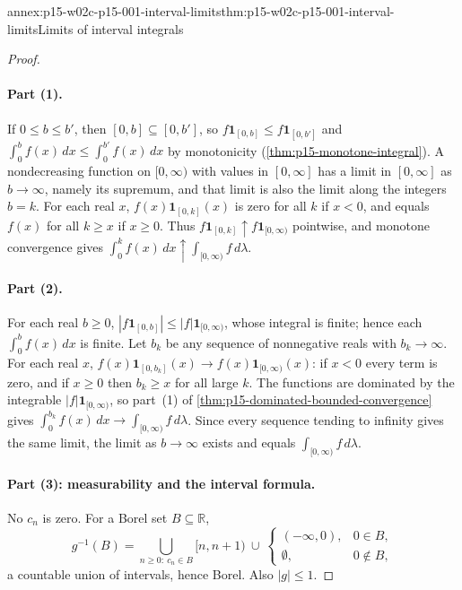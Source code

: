 \begin{annexitem}{annex:p15-w02c-p15-001-interval-limits}{thm:p15-w02c-p15-001-interval-limits}{Limits of interval integrals}
\begin{proof}
\paragraph{Part (1).}
If \(0\leq b\leq b'\), then \([0,b]\subseteq[0,b']\), so
\(f\mathbf1_{[0,b]}\leq f\mathbf1_{[0,b']}\) and
\(\int_0^bf(x)\,dx\leq\int_0^{b'}f(x)\,dx\) by monotonicity
(\cref{thm:p15-monotone-integral}). A nondecreasing function on
\([0,\infty)\) with values in \([0,\infty]\) has a limit in
\([0,\infty]\) as \(b\to\infty\), namely its supremum, and that limit is
also the limit along the integers \(b=k\). For each real \(x\),
\(f(x)\mathbf1_{[0,k]}(x)\) is zero for all \(k\) if \(x<0\), and equals
\(f(x)\) for all \(k\geq x\) if \(x\geq0\). Thus
\(f\mathbf1_{[0,k]}\uparrow f\mathbf1_{[0,\infty)}\) pointwise, and
monotone convergence gives
\(\int_0^kf(x)\,dx\uparrow\int_{[0,\infty)}f\,d\lambda\).

\paragraph{Part (2).}
For each real \(b\geq0\),
\(|f\mathbf1_{[0,b]}|\leq|f|\mathbf1_{[0,\infty)}\), whose integral is
finite; hence each \(\int_0^bf(x)\,dx\) is finite. Let \(b_k\) be any
sequence of nonnegative reals with \(b_k\to\infty\). For each real
\(x\), \(f(x)\mathbf1_{[0,b_k]}(x)\to f(x)\mathbf1_{[0,\infty)}(x)\): if
\(x<0\) every term is zero, and if \(x\geq0\) then \(b_k\geq x\) for all
large \(k\). The functions are dominated by the integrable
\(|f|\mathbf1_{[0,\infty)}\), so part~(1) of
\cref{thm:p15-dominated-bounded-convergence} gives
\(\int_0^{b_k}f(x)\,dx\to\int_{[0,\infty)}f\,d\lambda\). Since every
sequence tending to infinity gives the same limit, the limit as
\(b\to\infty\) exists and equals \(\int_{[0,\infty)}f\,d\lambda\).

\paragraph{Part (3): measurability and the interval formula.}
No \(c_n\) is zero. For a Borel set \(B\subseteq\mathbb R\),
\[
 g^{-1}(B)=\bigcup_{n\geq0:\ c_n\in B}[n,n+1)
 \ \cup\ \begin{cases}(-\infty,0),&0\in B,\\\emptyset,&0\notin B,\end{cases}
\]
a countable union of intervals, hence Borel. Also \(|g|\leq1\).


\end{proof}
\end{annexitem}
